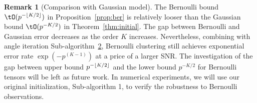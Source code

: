 \documentclass[lettersize,onecolumn,journal]{IEEEtran}
\theoremstyle{definition}
\theoremstyle{definition}
\newtheorem{rmk}{Remark}
\newcommand{\of}[1]{\left(#1\right)}
\DeclarePairedDelimiter{\floor}{\lfloor}{\rfloor}
\begin{document}
{\begin{itemize}[wide]


{
\color{blue}

\begin{rmk}[Comparison with Gaussian model] The Bernoulli bound $\tO(p^{- \floor{K/2} })$ in Proposition~\ref{prop:ber} is relatively looser than the Gaussian bound $\tO(p^{- K/2 })$ in Theorem~\ref{thm:initial}. The gap between Bernoulli and Gaussian error decreases as the order $K$ increases. Nevertheless, combining with angle iteration Sub-algorithm~\hyperref[alg:main]{2}, Bernoulli clustering still achieves exponential error rate $\exp \of{ - p^{(K-1)}}$ at a price of a larger SNR.
The investigation of the gap between upper bound $p^{- \floor{K/2}}$ and the lower bound $p^{- K/2}$ for Bernoulli tensors will be left as future work. In numerical experiments, we will use our original initialization, Sub-algorithm 1, to verify the robustness to Bernoulli observations.
\end{rmk}

}
\end{itemize}}
\end{document}
